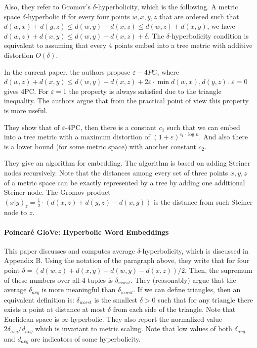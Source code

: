 \documentclass{article}
\begin{document}
Also, they refer to Gromov's $\delta$-hyperbolicity, which is the following. A metric space
$\delta$-hyperbolic if for every four points $w,x,y,z$ that are ordered such that $d(w,x) + d(y,z) \le d(w,y) + d(x,z) \le d(w,z) + d(x,y)$, we have $d(w, z) + d(x, y) \le d(w, y) + d(x, z) + \delta$. The $\delta$-hyperbolicity condition is equivalent to assuming that every 4 points embed into a tree metric with additive distortion $O(\delta)$.

In the current paper, the authors propose $\varepsilon-4PC$, where $d(w, z) + d(x, y) \le d(w, y) + d(x, z) + 2\varepsilon\cdot\min{d(w,x),d(y,z)}$. $\varepsilon = 0$ gives 4PC. For $\varepsilon = 1$ the property is always satisfied due to the triangle inequality. The authors argue that from the practical point of view this property is more useful.

They show that of $\varepsilon$-4PC, then there is a constant $c_1$ such that we can embed into a tree metric with a maximum distortion of $(1+\varepsilon)^{c_1 \cdot \log n}$. And also there is a lower bound (for some metric space) with another constant $c_2$.

They give an algorithm for embedding. The algorithm is based on adding Steiner nodes recursively. Note that the distances among every set of three points $x, y, z$ of a metric space can be exactly represented by a tree by adding one additional Steiner node. The Gromov product $(x|y)_z = \frac 1 2 \cdot (d(x,z) + d(y,z) - d(x,y))$ is the distance from such Steiner node to $z$.

\paragraph{Poincar\'e GloVe: Hyperbolic Word Embeddings~\cite{tifrea2018poincar}}

This paper discusses and computes average $\delta$-hyperbolicity, which is discussed in Appendix B. 
Using the notation of the paragraph above, they write that for four point $\delta = (d(w, z) + d(x, y) - d(w, y) - d(x, z))/2$. Then, the supremum of these numbers over all 4-tuples is $\delta_{worst}$.
They (reasonably) argue that the average $\delta_{avg}$ is more meaningful than $\delta_{worst}$.
If we can define triangles, then an equivalent definition is: $\delta_{worst}$ is the smallest $\delta > 0$ such that for any triangle there exists a point at distance at most $\delta$ from each side of the triangle. 
Note that Euclidean space is $\infty$-hyperbolic.
They also report the normalized value $2 \delta_{avg} / d_{avg}$ which is invariant to metric scaling. 
Note that low values of both $\delta_{avg}$ and $d_{avg}$ are indicators of some hyperbolicity. 
\end{document}

